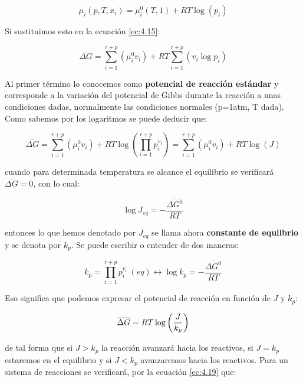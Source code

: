 \documentclass[12pt,a4paper,oneside]{book}
\begin{document}
\begin{equation}
\mu_i (p,T,x_i) = \mu_i^0 (T,1) + RT \log (p_i)
\end{equation}

Si sustituimos esto en la ecuación \ref{ec:4.15}:

\begin{equation}
\overline{\Delta G} =  \sum_{i=1}^{r+p} (\mu_i^0 v_i)+  RT  \sum_{i=1}^{r+p} (v_i \log p_i)
\end{equation}

Al primer término lo conocemos como \textbf{potencial de reacción estándar} y corresponde a la variación del potencial de Gibbs durante la reacción a unas condiciones dadas, normalmente las condiciones normales (p=1atm, T dada). Como sabemos por los logaritmos se puede deducir que:

\begin{equation}
\overline{\Delta G} =  \sum_{i=1}^{r+p} (\mu_i^0 v_i)+  RT \log \left( \prod_{i=1}^{r+p}   p_i^{v_i} \right)  = \sum_{i=1}^{r+p} (\mu_i^0 v_i)+  RT \log ( J )
\end{equation}

cuando para determinada temperatura se alcance el equilibrio se verificará $\overline{ \Delta  G } = 0$, con lo cual:

\begin{equation}
\log J_{eq} =  - \dfrac{\overline{\Delta G^0}}{RT}
\end{equation}

entonces lo que hemos denotado por $J_{eq}$ se llama ahora \textbf{constante de equilbrio} y se denota por $k_p$. Se puede escribir o entender de dos maneras:

\begin{equation}
k_p = \prod_{i=1}^{r+p} p_i^{v_i} \ (eq) \longleftrightarrow \log k_p =  - \dfrac{\overline{\Delta G^0}}{RT}
\end{equation}

Eso significa que podemos expresar el potencial de reacción en función de $J$ y $k_p$:

\begin{equation}
\overline{\Delta G} = RT \log \left( \dfrac{J}{k_p} \right)
\end{equation}

de tal forma que si $J>k_p$ la reacción avanzará hacia los reactivos, si $J=k_p$ estaremos en el equilibrio y si $J<k_p$ avanzaremos hacia los reactivos. Para un sistema de reacciones se verificará, por la ecuación \ref{ec:4.19} que:
\end{document}

